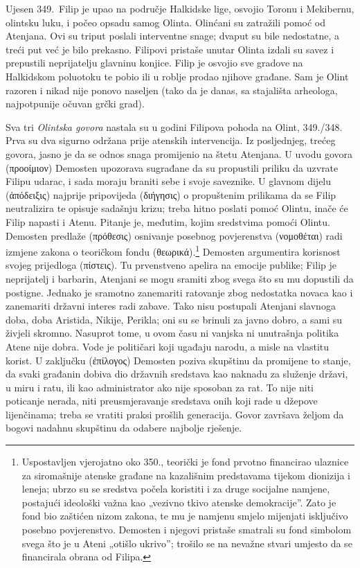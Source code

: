 Ujesen 349.\ Filip je upao na područje Halkidske lige, osvojio Toronu i Mekibernu, olintsku luku, i počeo opsadu samog Olinta. Olinćani su zatražili pomoć od Atenjana. Ovi su triput poslali interventne snage; dvaput su bile nedostatne, a treći put već je bilo prekasno. Filipovi pristaše unutar Olinta izdali su savez i prepustili neprijatelju glavninu konjice. Filip je osvojio sve gradove na Halkidskom poluotoku te pobio ili u roblje prodao njihove građane. Sam je Olint razoren i nikad nije ponovo naseljen (tako da je danas, sa stajališta arheologa, najpotpunije očuvan grčki grad).

Sva tri \textit{Olintska govora} nastala su u godini Filipova pohoda na Olint, 349./348. Prva su dva sigurno održana prije atenskih intervencija. Iz posljednjeg, trećeg govora, jasno je da se odnos snaga promijenio na štetu Atenjana. U uvodu govora \textgreek[variant=ancient]{(προοίμιον)} Demosten upozorava sugrađane da su propustili priliku da uzvrate Filipu udarac, i sada moraju braniti sebe i svoje saveznike. U glavnom dijelu \textgreek[variant=ancient]{(ἀπόδειξις)} najprije pripovijeda  \textgreek[variant=ancient]{(διήγησις)} o propuštenim prilikama da se Filip neutralizira te opisuje sadašnju krizu; treba hitno poslati pomoć Olintu, inače će Filip napasti i Atenu. Pitanje je, međutim, kojim sredstvima pomoći Olintu. Demosten predlaže \textgreek[variant=ancient]{(πρόθεσις)} osnivanje posebnog povjerenstva \textgreek[variant=ancient]{(νομοθέται)} radi izmjene zakona o teoričkom fondu \textgreek[variant=ancient]{(θεωρικά).}\footnote{Uspostavljen vjerojatno oko 350., teorički je fond prvotno financirao ulaznice za siromašnije atenske građane na kazališnim predstavama tijekom dionizija i leneja; ubrzo su se sredstva počela koristiti i za druge socijalne namjene, postajući ideološki važna kao „vezivno tkivo atenske demokracije”. Zato je fond bio zaštićen nizom zakona, te mu je namjenu smjelo mijenjati isključivo posebno povjerenstvo. Demosten i njegovi pristaše smatrali su fond simbolom svega što je u Ateni „otišlo ukrivo”; trošilo se na nevažne stvari umjesto da se financirala obrana od Filipa.} Demosten argumentira korisnost svojeg prijedloga (πίστεις). Tu prvenstveno apelira na emocije publike; Filip je neprijatelj i barbarin, Atenjani se mogu sramiti zbog svega što su mu dopustili da postigne. Jednako je sramotno zanemariti ratovanje zbog nedostatka novaca kao i zanemariti državni interes radi zabave. Tako nisu postupali Atenjani slavnoga doba, doba Aristida, Nikije, Perikla; oni su se brinuli za javno dobro, a sami su živjeli skromno. Nasuprot tome, u ovom času ni vanjska ni unutrašnja politika Atene nije dobra. Vode je političari koji ugađaju narodu, a misle na vlastitu korist. U zaključku (ἐπίλογος) Demosten poziva skupštinu da promijene to stanje, da svaki građanin dobiva dio državnih sredstava kao naknadu za služenje državi, u miru i ratu, ili kao administrator ako nije sposoban za rat. To nije niti poticanje nerada, niti preusmjeravanje sredstava onih koji rade u džepove lijenčinama; treba se vratiti praksi prošlih generacija. Govor završava željom da bogovi nadahnu skupštinu da odabere najbolje rješenje.

